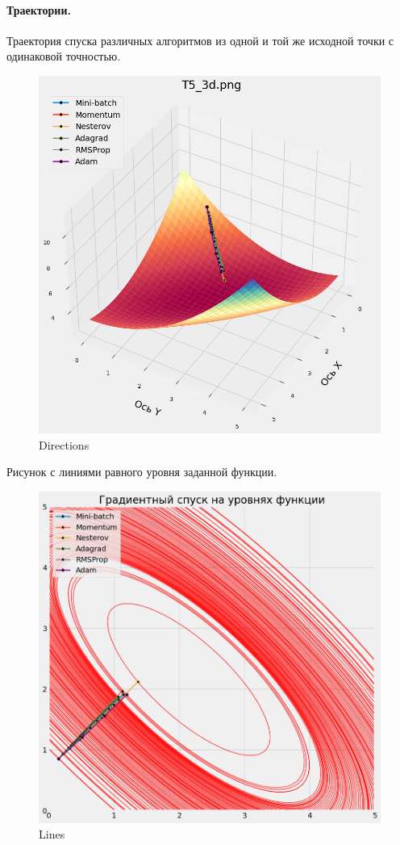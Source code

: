 \documentclass[12pt, a4paper, oneside, final]{article}
\begin{document}
	\paragraph{Траектории.}
	Траектория спуска различных алгоритмов из одной и той же исходной точки с одинаковой точностью.
	\begin{figure}[H]
		\centering
		\includegraphics[scale = 0.6]{Image/T5_DIRECTIONS.png}
		\caption*{Directions}
	\end{figure}
	Рисунок с линиями равного уровня заданной функции.
	\begin{figure}[H]
		\centering
		\includegraphics[scale = 0.6]{Image/T5_LINES.png}
		\caption*{Lines}
	\end{figure}
	\newpage
\end{document}
